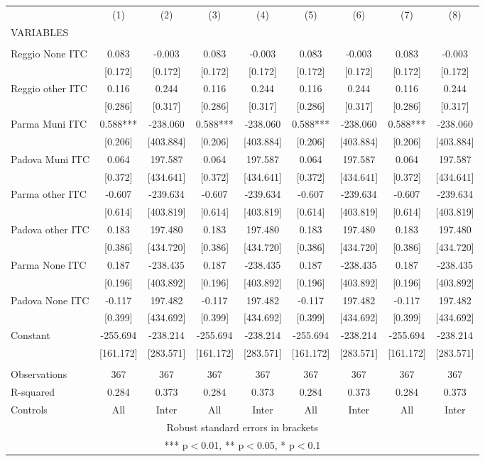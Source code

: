 \begin{tabular}{lcccccccc} \hline
 & (1) & (2) & (3) & (4) & (5) & (6) & (7) & (8) \\
VARIABLES &  &  &  &  &  &  &  &  \\ \hline
 &  &  &  &  &  &  &  &  \\
Reggio None ITC & 0.083 & -0.003 & 0.083 & -0.003 & 0.083 & -0.003 & 0.083 & -0.003 \\
 & [0.172] & [0.172] & [0.172] & [0.172] & [0.172] & [0.172] & [0.172] & [0.172] \\
Reggio other ITC & 0.116 & 0.244 & 0.116 & 0.244 & 0.116 & 0.244 & 0.116 & 0.244 \\
 & [0.286] & [0.317] & [0.286] & [0.317] & [0.286] & [0.317] & [0.286] & [0.317] \\
Parma Muni ITC & 0.588*** & -238.060 & 0.588*** & -238.060 & 0.588*** & -238.060 & 0.588*** & -238.060 \\
 & [0.206] & [403.884] & [0.206] & [403.884] & [0.206] & [403.884] & [0.206] & [403.884] \\
Padova Muni ITC & 0.064 & 197.587 & 0.064 & 197.587 & 0.064 & 197.587 & 0.064 & 197.587 \\
 & [0.372] & [434.641] & [0.372] & [434.641] & [0.372] & [434.641] & [0.372] & [434.641] \\
Parma other ITC & -0.607 & -239.634 & -0.607 & -239.634 & -0.607 & -239.634 & -0.607 & -239.634 \\
 & [0.614] & [403.819] & [0.614] & [403.819] & [0.614] & [403.819] & [0.614] & [403.819] \\
Padova other ITC & 0.183 & 197.480 & 0.183 & 197.480 & 0.183 & 197.480 & 0.183 & 197.480 \\
 & [0.386] & [434.720] & [0.386] & [434.720] & [0.386] & [434.720] & [0.386] & [434.720] \\
Parma None ITC & 0.187 & -238.435 & 0.187 & -238.435 & 0.187 & -238.435 & 0.187 & -238.435 \\
 & [0.196] & [403.892] & [0.196] & [403.892] & [0.196] & [403.892] & [0.196] & [403.892] \\
Padova None ITC & -0.117 & 197.482 & -0.117 & 197.482 & -0.117 & 197.482 & -0.117 & 197.482 \\
 & [0.399] & [434.692] & [0.399] & [434.692] & [0.399] & [434.692] & [0.399] & [434.692] \\
Constant & -255.694 & -238.214 & -255.694 & -238.214 & -255.694 & -238.214 & -255.694 & -238.214 \\
 & [161.172] & [283.571] & [161.172] & [283.571] & [161.172] & [283.571] & [161.172] & [283.571] \\
 &  &  &  &  &  &  &  &  \\
Observations & 367 & 367 & 367 & 367 & 367 & 367 & 367 & 367 \\
R-squared & 0.284 & 0.373 & 0.284 & 0.373 & 0.284 & 0.373 & 0.284 & 0.373 \\
 Controls & All & Inter & All & Inter & All & Inter & All & Inter \\ \hline
\multicolumn{9}{c}{ Robust standard errors in brackets} \\
\multicolumn{9}{c}{ *** p$<$0.01, ** p$<$0.05, * p$<$0.1} \\
\end{tabular}
